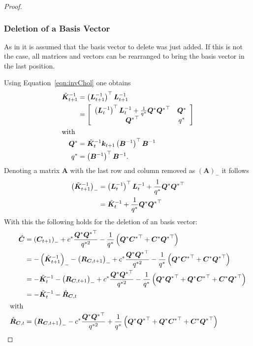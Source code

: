 \documentclass[11pt,a4paper,twoside,BCOR=15mm]{scrbook}
\newcommand{\vc}[1]{\bm{#1}}
\newcommand{\mat}[1]{\bm{#1}}
\newcommand{\Tr}{^{\top}}
\begin{document}
\begin{proof}
\subsubsection{Deletion of a Basis Vector}
As in \textcite{Csato:2002fp} it is assumed that the basis vector to delete was 
just added. If this is not the case, all matrices and vectors can be rearranged 
to bring the basis vector in the last position.

Using Equation~\ref{eqn:invChol} one obtains
\begin{align*}
    \tilde{\mat K}_{t+1}^{-1} &= \del[1]{\mat L_{t+1}^{-1}}\Tr \mat L_{t+1}^{-1} 
    \\
    &= \sbr{\begin{array}{cc}
            \del[1]{\mat L_t^{-1}}\Tr \mat L_t^{-1} + \frac{1}{q^*} \mat Q^* 
            {\mat Q^*}\Tr  & \mat Q^* \\
            {\mat Q^*}\Tr & q^*
        \end{array}} \\
\intertext{with}
    \mat Q^* &= \tilde{\mat K}_t^{-1} \vc k_{t+1} \del[1]{\mat B^{-1}}\Tr \mat 
    B^{-1} \\
    q^* &= \del[1]{\mat B^{-1}}\Tr \mat B^{-1} \text{.}
\end{align*}
Denoting a matrix $\mat A$ with the last row and column removed as 
${(\mat{A})}_-$ it follows
\begin{align*}
    \del[1]{\tilde{\mat K}_{t+1}^{-1}}_- &= \del[1]{\mat L_t^{-1}}\Tr \mat 
    L_t^{-1} + \frac{1}{q^*} \mat Q^* {\mat Q^*}\Tr \\
     &= \tilde{\mat K}_t^{-1} + \frac{1}{q^*} \mat Q^* {\mat Q^*}\Tr
\end{align*}
With this the following holds for the deletion of an basis vector:
\begin{align*}
    \hat{\mat C} &= \del{\mat C_{t+1}}_- + c^* \frac{\mat Q^* {\mat 
            Q^*}\Tr}{q^{*2}} - \frac{1}{q^*} \del{\mat Q^* {\mat C^*}\Tr + \mat 
        C^* {\mat Q^*}\Tr} \\
     &= -\del{\tilde{\mat K}_{t+1}^{-1}}_- - \del{\mat R_{\mat C, t+1}}_- + c^* 
     \frac{\mat Q^* {\mat Q^*}\Tr}{q^{*2}} - \frac{1}{q^*} \del{\mat Q^* {\mat 
             C^*}\Tr + \mat C^* {\mat Q^*}\Tr} \\
     &= -\tilde{\mat K}_{t}^{-1} - \del{\mat R_{\mat C, t+1}}_- + c^* \frac{\mat 
         Q^* {\mat Q^*}\Tr}{q^{*2}} - \frac{1}{q^*} \del{\mat Q^* {\mat Q^*}\Tr 
         + \mat Q^* {\mat C^*}\Tr + \mat C^* {\mat Q^*}\Tr} \\
     &= -\tilde{\mat K}_{t}^{-1} - \hat{\mat R}_{\mat C, t} \\
\intertext{with}
    \hat{\mat R}_{\mat C, t} &= \del{\mat R_{\mat C, t+1}}_- - c^* \frac{\mat 
        Q^* {\mat Q^*}\Tr}{q^{*2}} + \frac{1}{q^*} \del{\mat Q^* {\mat Q^*}\Tr 
        + \mat Q^* {\mat C^*}\Tr + \mat C^* {\mat Q^*}\Tr}
\end{align*}

\end{proof}
\end{document}
